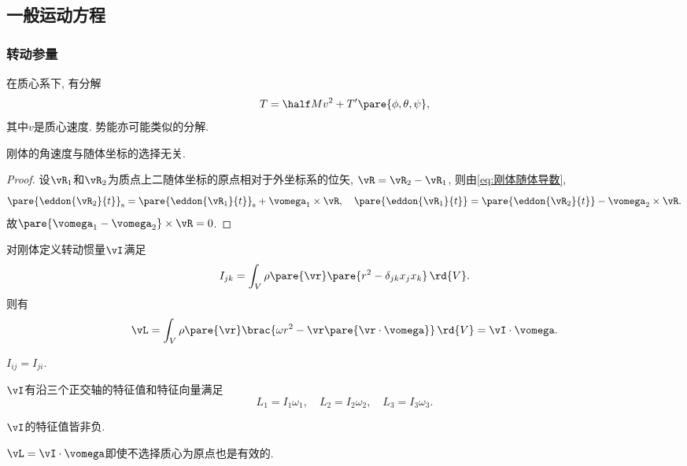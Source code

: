 \documentclass[../TheoreticalMechanics.tex]{subfiles}
\begin{document}


\subsection{一般运动方程} %
\label{sub:一般运动方程}

\subsubsection{转动参量} %
\label{ssub:转动参量}

\begin{lemma}[变量分离]
    在质心系下, 有分解
    \[ T = \half Mv^2 + T'\pare{\phi,\theta,\psi}, \]
    其中$v$是质心速度. 势能亦可能类似的分解.
\end{lemma}
\begin{lemma}[角速度的坐标无关性]
    刚体的角速度与随体坐标的选择无关.
\end{lemma}
\begin{proof}
    设$\vR_1$和$\vR_2$为质点上二随体坐标的原点相对于外坐标系的位矢, $\vR = \vR_2-\vR_1$, 则由\eqref{eq:刚体随体导数},
    \[ \pare{\eddon{\vR_2}{t}}_{\mathrm{s}} = \pare{\eddon{\vR_1}{t}}_{\mathrm{s}} + \vomega_1\times\vR,\quad \pare{\eddon{\vR_1}{t}} = \pare{\eddon{\vR_2}{t}} - \vomega_2\times\vR. \]
    故$\pare{\vomega_1 - \vomega_2}\times\vR = 0$.
\end{proof}
\begin{finale}
    \begin{theorem}[转动惯量]
        对刚体定义转动惯量$\vI$满足
        \[ I_{jk} = \int_V \rho\pare{\vr}\pare{r^2 - \delta_{jk} x_j x_k}\,\rd{V}. \]
        则有
        \[ \vL = \int_V \rho\pare{\vr}\brac{\omega r^2 - \vr\pare{\vr\cdot\vomega}}\,\rd{V} = \vI \cdot\vomega. \]
    \end{theorem}
\end{finale}
\begin{lemma}[转动惯量作为对称矩阵]
    $I_{ij} = I_{ji}$.
\end{lemma}
\begin{lemma}[转动惯量的特征值]
    $\vI$有沿三个正交轴的特征值和特征向量满足
    \[ L_1 = I_1 \omega_1,\quad L_2 = I_2 \omega_2,\quad L_3 = I_3 \omega_3. \]
\end{lemma}
\begin{lemma}[转动惯量特征值非负]
    $\vI$的特征值皆非负.
\end{lemma}
\begin{pitfall}
    $\vL = \vI\cdot\vomega$即使不选择质心为原点也是有效的.
\end{pitfall}
\end{document}
